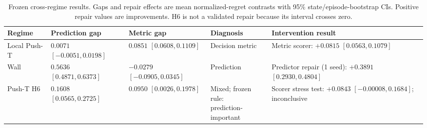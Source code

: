 \begin{table}[t]
  \caption{Frozen cross-regime results. Gaps and repair effects are mean normalized-regret contrasts with 95\% state/episode-bootstrap CIs. Positive repair values are improvements. H6 is not a validated repair because its interval crosses zero.}
  \label{tab:cross-regime}
  \centering
  \footnotesize
  \setlength{\tabcolsep}{2.5pt}
  \begin{tabular}{@{}lllll@{}}
    \toprule
    Regime & Prediction gap & Metric gap & Diagnosis & Intervention result \\
    \midrule
    Local Push-T & \shortstack[l]{$0.0071$\\$[-0.0051,0.0198]$} & \shortstack[l]{$0.0851$\\$[0.0608,0.1109]$} & Decision metric & \shortstack[l]{Metric scorer: $+0.0815$\\$[0.0563,0.1079]$} \\
    Wall & \shortstack[l]{$0.5636$\\$[0.4871,0.6373]$} & \shortstack[l]{$-0.0279$\\$[-0.0905,0.0345]$} & Prediction & \shortstack[l]{Predictor repair (1 seed): $+0.3891$\\$[0.2930,0.4804]$} \\
    Push-T H6 & \shortstack[l]{$0.1608$\\$[0.0565,0.2725]$} & \shortstack[l]{$0.0950$\\$[0.0026,0.1978]$} & \shortstack[l]{Mixed; frozen rule:\\prediction-important} & \shortstack[l]{Scorer stress test: $+0.0843$\\$[-0.00008,0.1684]$; inconclusive} \\
    \bottomrule
  \end{tabular}
\end{table}
